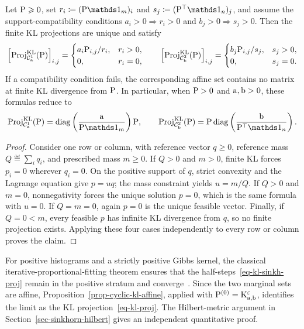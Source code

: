 \begin{prop}
	Let $\P\geq0$, set $r_i\eqdef(\P\ones_m)_i$ and $s_j\eqdef(\P^\top\ones_n)_j$, and assume the support-compatibility conditions
	\(
		a_i>0\Rightarrow r_i>0
	\)
	and
	\(
		b_j>0\Rightarrow s_j>0
	\).
	Then the finite KL projections are unique and satisfy
	\[
		\left[\Proj_{\Cc^1_\a}^{\KLD}(\P)\right]_{i,j}
		=
		\begin{cases}
			a_i\P_{i,j}/r_i,&r_i>0,\\
			0,&r_i=0,
		\end{cases}
		\qquad
		\left[\Proj_{\Cc^2_\b}^{\KLD}(\P)\right]_{i,j}
		=
		\begin{cases}
			b_j\P_{i,j}/s_j,&s_j>0,\\
			0,&s_j=0.
		\end{cases}
	\]
	If a compatibility condition fails, the corresponding affine set contains no matrix at finite KL divergence from $\P$. In particular, when $\P>0$ and $\a,\b>0$, these formulas reduce to
	\[
		\Proj_{\Cc^1_\a}^{\KLD}(\P)
		=
		\diag\pa{\frac{\a}{\P\ones_m}}\P,
		\qquad
		\Proj_{\Cc^2_\b}^{\KLD}(\P)
		=
		\P\diag\pa{\frac{\b}{\P^\top\ones_n}}.
	\]
\end{prop}
\begin{proof}
	Consider one row or column, with reference vector $q\geq0$, reference mass $Q\eqdef\sum_iq_i$, and prescribed mass $m\geq0$. If $Q>0$ and $m>0$, finite KL forces $p_i=0$ wherever $q_i=0$. On the positive support of $q$, strict convexity and the Lagrange equation give $p=u q$; the mass constraint yields $u=m/Q$. If $Q>0$ and $m=0$, nonnegativity forces the unique solution $p=0$, which is the same formula with $u=0$. If $Q=m=0$, again $p=0$ is the unique feasible vector. Finally, if $Q=0<m$, every feasible $p$ has infinite KL divergence from $q$, so no finite projection exists. Applying these four cases independently to every row or column proves the claim.
\end{proof}

For positive histograms and a strictly positive Gibbs kernel, the classical iterative-proportional-fitting theorem ensures that the half-steps~\eqref{eq-kl-sinkh-proj} remain in the positive stratum and converge~\cite{Ruschendorf95,RuschendorfThomsen}. Since the two marginal sets are affine, Proposition~\ref{prop-cyclic-kl-affine}, applied with $\P^{(0)}=\K_{\a,\b}^\epsilon$, identifies the limit as the KL projection~\eqref{eq-kl-proj}. The Hilbert-metric argument in Section~\ref{sec-sinkhorn-hilbert} gives an independent quantitative proof.

